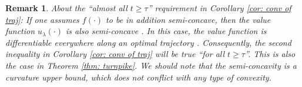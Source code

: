 \documentclass[12pt]{amsart}
\numberwithin{equation}{section}
\theoremstyle{plain}
\newtheorem{remark}[theorem]{Remark}
\begin{document}
\begin{remark}\label{rem: ae}
About the ``\textit{almost all} $t\geq \tau$'' requirement in Corollary \ref{cor: conv of traj}: If one assumes $f(\cdot)$ to be in addition semi-concave, then the value function $u_{\lambda}(\cdot)$ is also semi-concave \cite[Lemma 2]{bardi2023eikonal}. In this case, the value function is differentiable \textit{everywhere} along an optimal trajectory \cite[Theorem 6.4.7, page 165]{cannarsa2004semiconcave}. Consequently, the second inequality in Corollary \ref{cor: conv of traj} will be true ``\textit{for all} $t\geq \tau$''. This is also the case in  Theorem \ref{thm: turnpike}. We should note that the semi-concavity is a curvature upper bound, which does not conflict with any type of convexity.
\end{remark}
\end{document}
